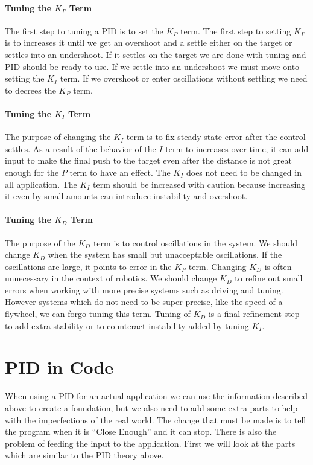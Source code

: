 \documentclass[12pt]{article}
\begin{document}
\paragraph{Tuning the $K_P$ Term}
    The first step to tuning a PID is to set the $K_P$ term. The first step to setting $K_P$ is to increases it until we get an overshoot and a settle either on the target or settles into an undershoot. If it settles on the target we are done with tuning and PID should be ready to use. If we settle into an undershoot we must move onto setting the $K_I$ term. If we overshoot or enter oscillations without settling we need to decrees the $K_P$ term.

\paragraph{Tuning the $K_I$ Term}
    The purpose of changing the $K_I$ term is to fix steady state error after the control settles. As a result of the behavior of the $I$ term to increases over time, it can add input to make the final push to the target even after the distance is not great enough for the $P$ term to have an effect. The $K_I$ does not need to be changed in all application. The $K_I$ term should be increased with caution because increasing it even by small amounts can introduce instability and overshoot.

\paragraph{Tuning the $K_D$ Term}
    The purpose of the $K_D$ term is to control oscillations in the system. We should change $K_D$ when the system has small but unacceptable oscillations. If the oscillations are large, it points to error in the $K_P$ term. Changing $K_D$ is often unnecessary in the context of robotics. We should change $K_D$ to refine out small errors when working with more precise systems such as driving and tuning. However systems which do not need to be super precise, like the speed of a flywheel, we can forgo tuning this term. Tuning of $K_D$ is a final refinement step to add extra stability or to counteract instability added by tuning $K_I$.

\newpage
\section{PID in Code}
    When using a PID for an actual application we can use the information described above to create a foundation, but we also need to add some extra parts to help with the imperfections of the real world. The change that must be made is to tell the program when it is ``Close Enough'' and it can stop. There is also the problem of feeding the input to the application. First we will look at the parts which are similar to the PID theory above.
\end{document}
